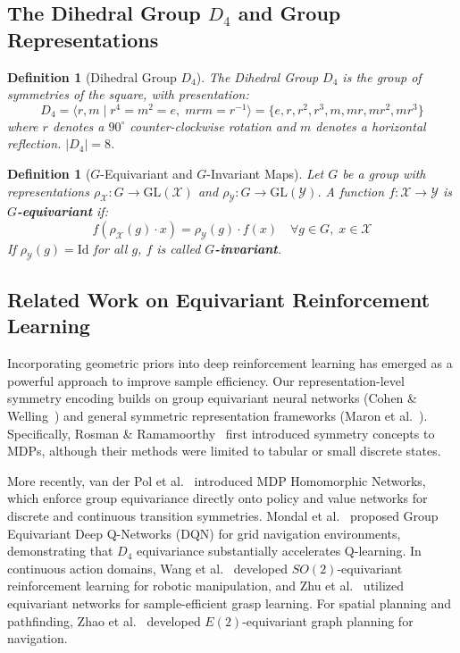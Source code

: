 \documentclass{article}
\newtheorem{definition}[theorem]{Definition}
\begin{document}
\subsection{The Dihedral Group $D_4$ and Group Representations}

\begin{definition}[Dihedral Group $D_4$]
The Dihedral Group $D_4$ is the group of symmetries of the square, with presentation:
\begin{equation}
    D_4 = \langle r, m \mid r^4 = m^2 = e,\; mrm = r^{-1} \rangle
    = \{ e, r, r^2, r^3, m, mr, mr^2, mr^3 \}
\end{equation}
where $r$ denotes a $90^\circ$ counter-clockwise rotation and $m$ denotes a horizontal reflection. $|D_4| = 8$.
\end{definition}

\begin{definition}[$G$-Equivariant and $G$-Invariant Maps]
Let $G$ be a group with representations $\rho_\mathcal{X}: G \to \mathrm{GL}(\mathcal{X})$ and $\rho_\mathcal{Y}: G \to \mathrm{GL}(\mathcal{Y})$. A function $f: \mathcal{X} \to \mathcal{Y}$ is \textbf{$G$-equivariant} if:
\begin{equation}
    f(\rho_\mathcal{X}(g) \cdot x) = \rho_\mathcal{Y}(g) \cdot f(x) \quad \forall g \in G,\; x \in \mathcal{X}
\end{equation}
If $\rho_\mathcal{Y}(g) = \mathrm{Id}$ for all $g$, $f$ is called \textbf{$G$-invariant}.
\end{definition}

\subsection{Related Work on Equivariant Reinforcement Learning}
Incorporating geometric priors into deep reinforcement learning has emerged as a powerful approach to improve sample efficiency. Our representation-level symmetry encoding builds on group equivariant neural networks (Cohen \& Welling~\cite{cohen2016group}) and general symmetric representation frameworks (Maron et al.~\cite{maron2020learning}). Specifically, Rosman \& Ramamoorthy~\cite{rosman2011learning} first introduced symmetry concepts to MDPs, although their methods were limited to tabular or small discrete states.

More recently, van der Pol et al.~\cite{vanderpol2020mdp} introduced MDP Homomorphic Networks, which enforce group equivariance directly onto policy and value networks for discrete and continuous transition symmetries. Mondal et al.~\cite{mondal2020group} proposed Group Equivariant Deep Q-Networks (DQN) for grid navigation environments, demonstrating that $D_4$ equivariance substantially accelerates Q-learning. In continuous action domains, Wang et al.~\cite{wang2022so} developed $SO(2)$-equivariant reinforcement learning for robotic manipulation, and Zhu et al.~\cite{zhu2022sample} utilized equivariant networks for sample-efficient grasp learning. For spatial planning and pathfinding, Zhao et al.~\cite{zhao2024e2} developed $E(2)$-equivariant graph planning for navigation. 
\end{document}
